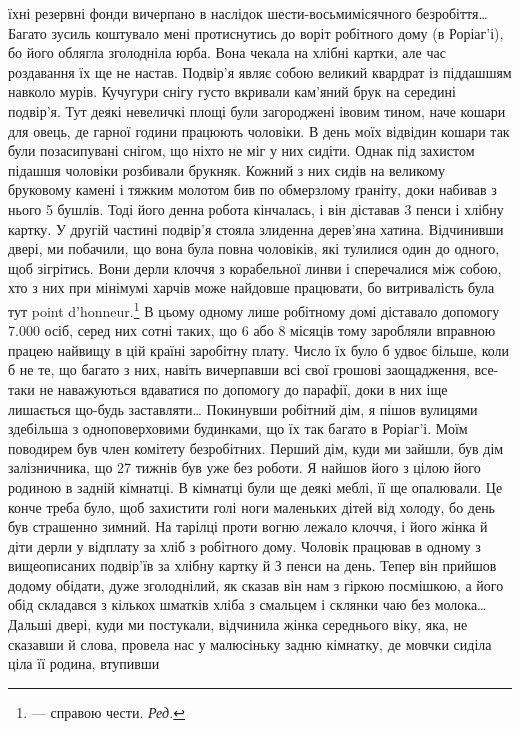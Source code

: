 їхні резервні фонди вичерпано в наслідок шести-восьмимісячного
безробіття\dots{} Багато зусиль коштувало мені протиснутись
до воріт робітного дому (в Роріаг’і), бо його облягла зголодніла
юрба. Вона чекала на хлібні картки, але час роздавання
їх ще не настав. Подвір’я являє собою великий квардрат із
піддашшям навколо мурів. Кучугури снігу густо вкривали
кам’яний брук на середині подвір’я. Тут деякі невеличкі площі
були загороджені івовим тином, наче кошари для овець, де гарної
години працюють чоловіки. В день моїх відвідин кошари так
були позасипувані снігом, що ніхто не міг у них сидіти. Однак
під захистом підашшя чоловіки розбивали брукняк. Кожний з
них сидів на великому бруковому камені і тяжким молотом бив
по обмерзлому ґраніту, доки набивав з нього 5 бушлів. Тоді його
денна робота кінчалась, і він діставав 3 пенси і хлібну картку.
У другій частині подвір’я стояла злиденна дерев’яна хатина.
Відчинивши двері, ми побачили, що вона була повна чоловіків,
які тулилися один до одного, щоб зігрітись. Вони дерли клоччя
з корабельної линви і сперечалися між собою, хто з них при мінімумі
харчів може найдовше працювати, бо витривалість була
тут point d’honneur.\footnote*{
— справою чести. \emph{Ред.}
} В цьому одному лише робітному домі діставало
допомогу 7.000 осіб, серед них сотні таких, що 6 або 8 місяців
тому заробляли вправною працею найвищу в цій країні
заробітну плату. Число їх було б удвоє більше, коли б не те,
що багато з них, навіть вичерпавши всі свої грошові заощадження,
все-таки не наважуються вдаватися по допомогу до парафії,
доки в них іще лишається що-будь заставляти\dots{} Покинувши робітний
дім, я пішов вулицями здебільша з одноповерховими будинками,
що їх так багато в Роріаг’і. Моїм поводирем був член
комітету безробітних. Перший дім, куди ми зайшли, був дім
залізничника, що 27 тижнів був уже без роботи. Я найшов його
з цілою його родиною в задній кімнатці. В кімнатці були ще
деякі меблі, її ще опалювали. Це конче треба було, щоб захистити
голі ноги маленьких дітей від холоду, бо день був страшенно
зимний. На тарілці проти вогню лежало клоччя, і його жінка
й діти дерли у відплату за хліб з робітного дому. Чоловік працював
в одному з вищеописаних подвір’їв за хлібну картку й
З пенси на день. Тепер він прийшов додому обідати, дуже зголоднілий,
як сказав він нам з гіркою посмішкою, а його обід
складався з кількох шматків хліба з смальцем і склянки чаю
без молока\dots{} Дальші двері, куди ми постукали, відчинила жінка
середнього віку, яка, не сказавши й слова, провела нас у малюсіньку
задню кімнатку, де мовчки сиділа ціла її родина, втупивши
\parbreak{}  %
